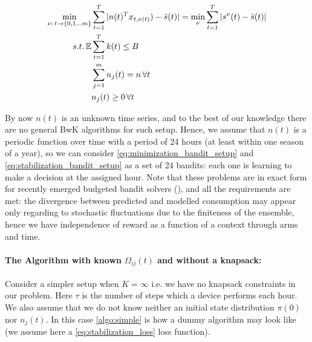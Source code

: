 \begin{align}    
    \begin{split}
    \label{eq:stabilization_bandit_setup}
    \min_{\nu:\, t \to \{0, 1\dots m\} }& \sum_{t=1}^T|n(t)^Tx_{t, \nu(t)}) - \bar s(t)| = \min_{\nu } \sum_{t=1}^T|s^\nu(t) - \bar s(t)|\\
     s.t. \operatorname{\mathbb{E}}& \sum_{t=1}^T k(t) \leq B \\
     & \sum_{j=1}^m n_j(t) = n\, \forall t \\
     & n_j(t) \geq 0\, \forall t
     \end{split}
\end{align}

By now $n(t)$ is an unknown time series, and to the best of our knowledge there are no general BwK algorithms for such setup. Hence, we assume that $n(t)$ is a periodic function over time with a period of 24 hours (at least within one season of a year), so we can consider \ref{eq:minimization_bandit_setup} and \ref{eq:stabilization_bandit_setup} as a set of 24 bandits: each one is learning to make a decision at the assigned hour. Note that these problems are in exact form for recently emerged budgeted bandit solvers (\cite{Agrawal2015}), and all the requirements are met: the divergence between predicted and modelled consumption may appear only regarding to stochastic fluctuations due to the finiteness of the ensemble, hence we have independence of reward as a function of a context through arms and time. 


\paragraph{The Algorithm with known $\Omega_{ij}(t)$ and without a knapsack:} Consider a simpler setup when $K = \infty$ i.e. we have no knapsack constraints in our problem. Here $\tau$ is the number of steps which a device performs each hour. We also assume that we do not know neither an initial state distribution $\pi(0)$ nor $n_j(t)$. In this case \ref{algo:simple} is how a dummy algorithm may look like (we assume here a \ref{eq:stabilization_loss} loss function).

